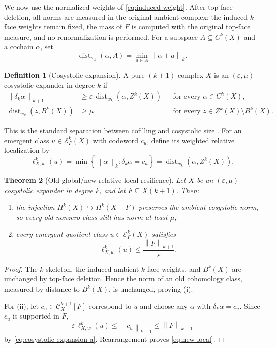 \documentclass[11pt,letterpaper]{article}
\theoremstyle{plain}
\newtheorem{theorem}{Theorem}[section]
\theoremstyle{definition}
\newtheorem{definition}[theorem]{Definition}
\newcommand{\cC}{\mathcal{C}}
\newcommand{\cE}{\mathcal{E}}
\newcommand{\dist}{\operatorname{dist}}
\newcommand{\1}{\mathbf{1}}
\newcommand{\norm}[1]{\left\lVert#1\right\rVert}
\newcommand{\set}[1]{\left\{#1\right\}}
\begin{document}
We now use the normalized weights of \eqref{eq:induced-weight}.  After top-face
deletion, all norms are measured in the original ambient complex: the induced $k$-face
weights remain fixed, the mass of $F$ is computed with the original top-face measure,
and no renormalization is performed.  For a subspace $A\subseteq C^k(X)$ and a
cochain $\alpha$, set
\[
 \dist_{w_k}(\alpha,A)=\min_{a\in A}\norm{\alpha+a}_k.
\]

\begin{definition}[Cosystolic expansion]\label{def:cosystolic}
A pure $(k+1)$-complex $X$ is an $(\varepsilon,\mu)$-cosystolic expander in degree $k$
if
\begin{align}
 \norm{\delta_k\alpha}_{k+1}
 &\ge \varepsilon\,\dist_{w_k}(\alpha,Z^k(X))
 &&\text{for every }\alpha\in C^k(X),
 \label{eq:cosystolic-expansion-a}\\
 \dist_{w_k}(z,B^k(X))
 &\ge\mu
 &&\text{for every }z\in Z^k(X)\setminus B^k(X).
 \label{eq:cosystolic-expansion-b}
\end{align}
\end{definition}

This is the standard separation between cofilling and cosystolic size
\cite{evrakaufman2024,diksteindinur2024}.  For an emergent class
$u\in\cE_F^k(X)$ with codeword $c_u$, define its weighted relative localization by
\[
 \ell_{X,w}^k(u)=
 \min\set{\norm{\alpha}_k:\delta_k\alpha=c_u}
 =\dist_{w_k}(\alpha,Z^k(X)).
\]

\begin{theorem}[Old-global/new-relative-local resilience]
\label{thm:old-new}
Let $X$ be an $(\varepsilon,\mu)$-cosystolic expander in degree $k$, and let
$F\subseteq X(k+1)$.  Then:
\begin{enumerate}[label=\textup{(\roman*)},leftmargin=2.2em]
\item the injection $H^k(X)\hookrightarrow H^k(X-F)$ preserves the ambient
cosystolic norm, so every old nonzero class still has norm at least $\mu$;
\item every emergent quotient class $u\in\cE_F^k(X)$ satisfies
\begin{equation}\label{eq:new-local}
 \ell_{X,w}^k(u)\le \frac{\norm F_{k+1}}{\varepsilon}.
\end{equation}
\end{enumerate}
\end{theorem}

\begin{proof}
The $k$-skeleton, the induced ambient $k$-face weights, and $B^k(X)$ are unchanged by
top-face deletion.  Hence the norm of an old cohomology class, measured by distance to
$B^k(X)$, is unchanged, proving (i).

For (ii), let $c_u\in\cC_X^{k+1}[F]$ correspond to $u$ and choose any
$\alpha$ with $\delta_k\alpha=c_u$.  Since $c_u$ is supported in $F$,
\[
 \varepsilon\,\ell_{X,w}^k(u)
 \le\norm{c_u}_{k+1}
 \le\norm F_{k+1}
\]
by \eqref{eq:cosystolic-expansion-a}.  Rearrangement proves
\eqref{eq:new-local}.
\end{proof}
\end{document}
